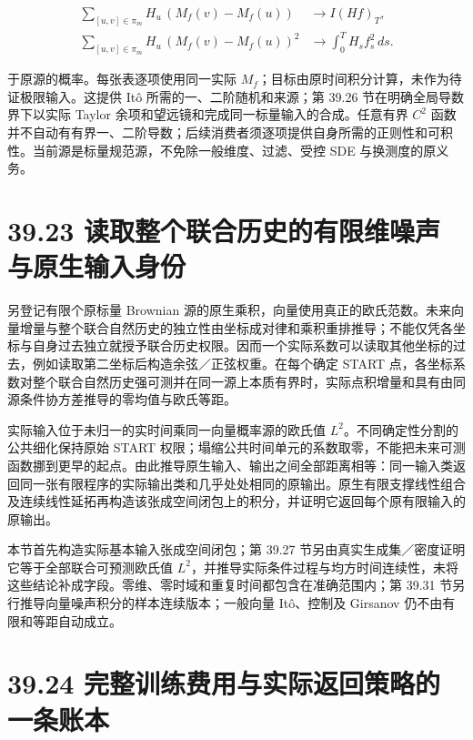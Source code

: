 \documentclass[
  11pt,
  oneside]{book}
\begin{document}
\[\begin{aligned}
\sum_{[u,v]\in\pi_m}H_u\,(M_f(v)-M_f(u)) &\longrightarrow I(Hf)_T,\\
\sum_{[u,v]\in\pi_m}H_u\,(M_f(v)-M_f(u))^2 &\longrightarrow \int_0^T H_sf_s^2\,ds.
\end{aligned}\]

于原源的概率。每张表逐项使用同一实际 \(M_f\)；目标由原时间积分计算，未作为待证极限输入。这提供 Itô 所需的一、二阶随机和来源；第 39.26 节在明确全局导数界下以实际 Taylor 余项和望远镜和完成同一标量输入的合成。任意有界 \(C^2\) 函数并不自动有有界一、二阶导数；后续消费者须逐项提供自身所需的正则性和可积性。当前源是标量规范源，不免除一般维度、过滤、受控 SDE 与换测度的原义务。

\section{39.23 读取整个联合历史的有限维噪声与原生输入身份}\label{ux8bfbux53d6ux6574ux4e2aux8054ux5408ux5386ux53f2ux7684ux6709ux9650ux7ef4ux566aux58f0ux4e0eux539fux751fux8f93ux5165ux8eabux4efd}

另登记有限个原标量 Brownian 源的原生乘积，向量使用真正的欧氏范数。未来向量增量与整个联合自然历史的独立性由坐标成对律和乘积重排推导；不能仅凭各坐标与自身过去独立就授予联合历史权限。因而一个实际系数可以读取其他坐标的过去，例如读取第二坐标后构造余弦／正弦权重。在每个确定 START 点，各坐标系数对整个联合自然历史强可测并在同一源上本质有界时，实际点积增量和具有由同源条件协方差推导的零均值与欧氏等距。

实际输入位于未归一的实时间乘同一向量概率源的欧氏值 \(L^2\)。不同确定性分割的公共细化保持原始 START 权限；塌缩公共时间单元的系数取零，不能把未来可测函数挪到更早的起点。由此推导原生输入、输出之间全部距离相等：同一输入类返回同一张有限程序的实际输出类和几乎处处相同的原输出。原生有限支撑线性组合及连续线性延拓再构造该张成空间闭包上的积分，并证明它返回每个原有限输入的原输出。

本节首先构造实际基本输入张成空间闭包；第 39.27 节另由真实生成集／密度证明它等于全部联合可预测欧氏值 \(L^2\)，并推导实际条件过程与均方时间连续性，未将这些结论补成字段。零维、零时域和重复时间都包含在准确范围内；第 39.31 节另行推导向量噪声积分的样本连续版本；一般向量 Itô、控制及 Girsanov 仍不由有限和等距自动成立。

\section{39.24 完整训练费用与实际返回策略的一条账本}\label{ux5b8cux6574ux8badux7ec3ux8d39ux7528ux4e0eux5b9eux9645ux8fd4ux56deux7b56ux7565ux7684ux4e00ux6761ux8d26ux672c}
\end{document}

